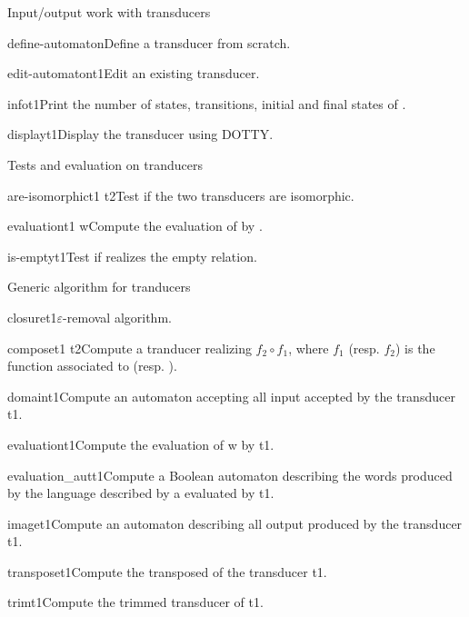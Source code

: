 \begin{fnsection}{Input/output work with transducers}
\item{define-automaton}{}{Define a transducer from scratch.}
\item{edit-automaton}{t1}{Edit an existing transducer.}
\item{info}{t1}{Print the number of states, transitions, initial and
    final states of .}
\item{display}{t1}{Display the transducer using DOTTY.}  \hline
\end{fnsection}

\begin{fnsection}{Tests and evaluation on tranducers}
\item{are-isomorphic}{t1 t2}{Test if the two transducers are
    isomorphic.}
\item{evaluation}{t1 w}{Compute the evaluation of  by
    .}
\item{is-empty}{t1}{Test if  realizes the empty relation.}
  \hline
\end{fnsection}

\begin{fnsection}{Generic algorithm for tranducers}
\item{closure}{t1}{$\varepsilon$-removal algorithm.}

\item{compose}{t1 t2}{Compute a tranducer realizing $f_2 \circ f_1$,
    where $f_1$ (resp. $f_2$) is the function associated to 
    (resp. ).}

\item{domain}{t1}{Compute an automaton accepting all input accepted by
    the transducer t1.}

\item{evaluation}{t1}{Compute the evaluation of w by t1.}

\item{evaluation\_aut}{t1}{Compute a Boolean automaton describing the
    words produced by the language described by a evaluated by t1.}

\item{image}{t1}{Compute an automaton describing all output produced
    by the transducer t1.}

\item{transpose}{t1}{Compute the transposed of the transducer t1.}

\item{trim}{t1}{Compute the trimmed transducer of t1.}  \hline
\end{fnsection}

